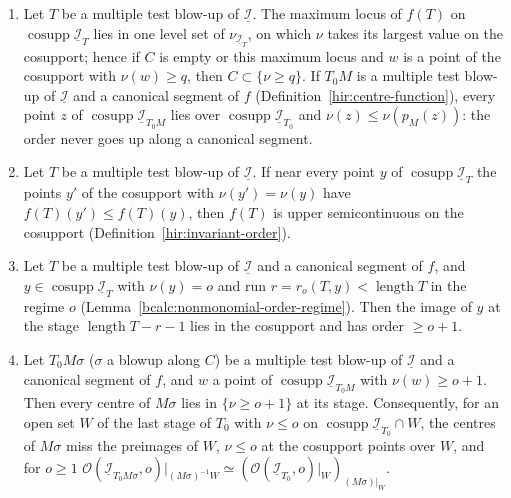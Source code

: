 \begin{lemma}
\begin{enumerate}
\(\nu_{\underline{\mathcal I}_\sigma}\le q\) at the points of \(\operatorname{cosupp}\underline{\mathcal I}_\sigma\) over \(C\). If \(q=0\), \(\nu_{\underline{\mathcal I}_\sigma}=0\) at
every point of the strict transform \(N'\) over \(C\).
\item Let \(T\) be a multiple test blow-up of \(\underline{\mathcal I}\). The maximum locus of \(f(T)\) on \(\operatorname{cosupp}\underline{\mathcal I}_T\) lies in one level set of
\(\nu_{\underline{\mathcal I}_T}\), on which \(\nu\) takes its largest value on the cosupport; hence if \(C\) is empty or this maximum locus and \(w\) is a point of the
cosupport with \(\nu(w)\ge q\), then \(C\subset\{\nu\ge q\}\). If \(T_0M\) is a multiple test blow-up of \(\underline{\mathcal I}\) and a canonical segment of \(f\)
(Definition~\ref{hir:centre-function}), every point \(z\) of \(\operatorname{cosupp}\underline{\mathcal I}_{T_0M}\) lies over \(\operatorname{cosupp}\underline{\mathcal I}_{T_0}\) and
\(\nu(z)\le\nu(p_M(z))\): the order never goes up along a canonical segment.
\item Let \(T\) be a multiple test blow-up of \(\underline{\mathcal I}\). If near every point \(y\) of \(\operatorname{cosupp}\underline{\mathcal I}_T\) the points \(y'\) of the cosupport
with \(\nu(y')=\nu(y)\) have \(f(T)(y')\le f(T)(y)\), then \(f(T)\) is upper semicontinuous on the cosupport (Definition~\ref{hir:invariant-order}).
\item Let \(T\) be a multiple test blow-up of \(\underline{\mathcal I}\) and a canonical segment of \(f\), and \(y\in\operatorname{cosupp}\underline{\mathcal I}_T\) with
\(\nu(y)=o\) and run \(r=r_o(T,y)<\operatorname{length}T\) in the regime \(o\) (Lemma~\ref{bcalc:nonmonomial-order-regime}). Then the image of \(y\) at the stage
\(\operatorname{length}T-r-1\) lies in the cosupport and has order \(\ge o+1\).
\item Let \(T_0M\sigma\) (\(\sigma\) a blowup along \(C\)) be a multiple test blow-up of \(\underline{\mathcal I}\) and a canonical segment of \(f\), and \(w\) a point of
\(\operatorname{cosupp}\underline{\mathcal I}_{T_0M}\) with \(\nu(w)\ge o+1\). Then every centre of \(M\sigma\) lies in \(\{\nu\ge o+1\}\) at its stage. Consequently, for an
open set \(W\) of the last stage of \(T_0\) with \(\nu\le o\) on \(\operatorname{cosupp}\underline{\mathcal I}_{T_0}\cap W\), the centres of \(M\sigma\) miss the preimages
of \(W\), \(\nu\le o\) at the cosupport points over \(W\), and for \(o\ge1\)
\(\mathcal O(\underline{\mathcal I}_{T_0M\sigma},o)|_{(M\sigma)^{-1}W}\simeq(\mathcal O(\underline{\mathcal I}_{T_0},o)|_W)_{(M\sigma)|_W}\).
\end{enumerate}
\end{lemma}
